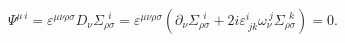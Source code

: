 \begin{equation}
\Psi^{\mu\, i}=\varepsilon ^{\mu \nu \rho \sigma }D_{\nu }\Sigma _{\rho \sigma }^{\ \ i}=
\varepsilon ^{\mu \nu \rho \sigma }\left( \partial
_{\nu }\Sigma _{\rho \sigma }^{\ \ i}+2i\varepsilon _{\ jk}^{i}\omega _{\nu }^{\ j}\Sigma
_{\rho \sigma }^{\ \ k}\right) =0.
\end{equation}

